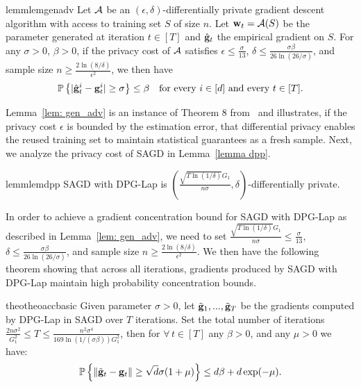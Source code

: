 \documentclass[11pt]{article}
\begin{document}
\begin{restatable}{lemm}{lemgenadv}
\label{lem: gen_adv}
	Let $\cA$ be an $(\epsilon, \delta)$-differentially private gradient descent algorithm with access to training set $S$ of size $n$. Let $\w_t = \cA(S)$ be the parameter generated at iteration $t \in [T]$ and $\hat {\mathbf{g}}_t$ the empirical gradient on $S$. For any $\sigma >0$, $\beta > 0$, if the privacy cost of $\cA$ satisfies $\epsilon \leq \frac{\sigma}{13}$, $\delta \leq \frac{\sigma \beta}{26 \ln(26/\sigma)}$, and sample size $n \geq \frac{2\ln(8/\delta)}{\epsilon^2}$, we then have
	\begin{equation*}
	\mathbb{P}\left\{ |\hat {\mathbf{g}}_t^i - \mathbf{g}_t^i| \geq  \sigma \right\} \leq \beta \quad \textrm{for every $ i\in [d]$ and every $t \in [T]$} .
	\end{equation*} 
\end{restatable}
Lemma~\ref{lem: gen_adv} is an instance of Theorem 8 from~\cite{dwfe15} and illustrates, if the privacy cost $\epsilon$ is bounded by the estimation error, that differential privacy enables the reused training set to maintain statistical guarantees as a fresh sample. Next, we analyze the privacy cost of \textsc{SAGD} in Lemma~\ref{lemma dpp}.



\begin{restatable}{lemm}{lemdpp}
\label{lemma dpp}
	\textsc{SAGD} with DPG-Lap is 
	$(\frac{\sqrt{T \ln(1/\delta)} G_1}{n\sigma}, \delta)$-differentially private. 
\end{restatable} 


In order to achieve a gradient concentration bound for \textsc{SAGD} with DPG-Lap as described in Lemma~\ref{lem: gen_adv}, we need to set $\frac{\sqrt{T \ln(1/\delta)} G_1}{n\sigma} \leq \frac{\sigma}{13}$, $\delta \leq \frac{\sigma \beta}{26 \ln(26/\sigma)}$, and  sample size $n \geq \frac{2\ln(8/\delta)}{\epsilon^2}$. We then have the following theorem showing that across all iterations, gradients produced by \textsc{SAGD} with DPG-Lap maintain high probability concentration bounds.

\begin{restatable}{theo}{theoaccbasic}
\label{thm: acc_basic}
Given parameter $\sigma > 0$, let $\tilde {\mathbf{g}}_1,...,  \tilde {\mathbf{g}}_T$ be the gradients computed by DPG-Lap in \textsc{SAGD} over $T$ iterations. Set the total number of iterations $ \frac{2n\sigma^2}{G_1^2}\leq T \leq \frac{n^2 \sigma^4}{169 \ln(1/(\sigma \beta))G_1^2}$, then for $\forall\, t \in [T]$ any $\beta >0$, and any $\mu > 0$ we have:
    \begin{equation*}
    \mathbb{P}\left\{\|\tilde {\mathbf{g}}_t - \mathbf{g}_t\| \geq \sqrt{d}\sigma(1+\mu)\right\} \leq d\beta + d\exp(-\mu).
    \end{equation*}
\end{restatable}
\end{document}
